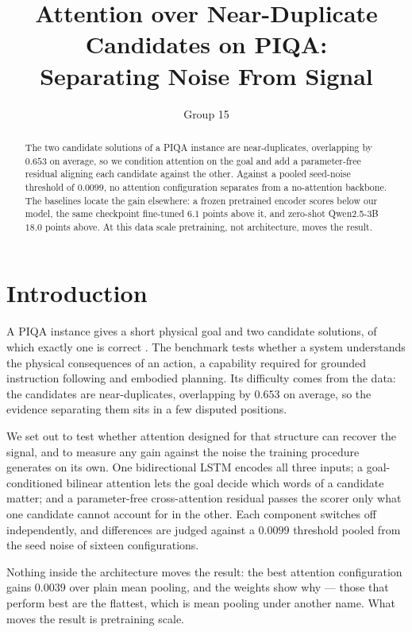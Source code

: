 \documentclass[11pt]{article}
\title{Attention over Near-Duplicate Candidates on PIQA:\\Separating Noise From Signal}
\author{Group 15}
\date{}
\begin{document}
\maketitle

\begin{abstract}
  The two candidate solutions of a PIQA instance are near-duplicates,
  overlapping by $0.653$ on average, so we condition attention on the goal and
  add a parameter-free residual aligning each candidate against the other.
  Against a pooled seed-noise threshold of $0.0099$, no attention
  configuration separates from a no-attention backbone. The baselines locate
  the gain elsewhere: a frozen pretrained encoder scores below our model, the
  same checkpoint fine-tuned $6.1$ points above it, and zero-shot Qwen2.5-3B
  $18.0$ points above. At this data scale pretraining, not architecture, moves
  the result.
\end{abstract}

\section{Introduction}
\label{sec:intro}

A PIQA instance gives a short physical goal and two candidate solutions, of
which exactly one is correct \citep{bisk2020piqa}. The benchmark tests whether
a system understands the physical consequences of an action, a capability
required for grounded instruction following and embodied planning. Its
difficulty comes from the data: the candidates are near-duplicates,
overlapping by $0.653$ on average, so the evidence separating them sits in a
few disputed positions.

We set out to test whether attention designed for that structure can recover
the signal, and to measure any gain against the noise the training procedure
generates on its own. One bidirectional LSTM encodes all three inputs; a
goal-conditioned
bilinear attention \citep{luong2015attention} lets the goal decide which words
of a candidate matter; and a parameter-free cross-attention residual
\citep{chen2017esim} passes the scorer only what one candidate cannot account
for in the other. Each component switches off
independently, and differences are judged against a $0.0099$ threshold pooled
from the seed noise of sixteen configurations.

Nothing inside the architecture moves the result: the best attention
configuration gains $0.0039$ over plain mean pooling, and the weights show why
--- those that perform best are the flattest, which is mean pooling under
another name. What moves the result is pretraining scale.
\end{document}
